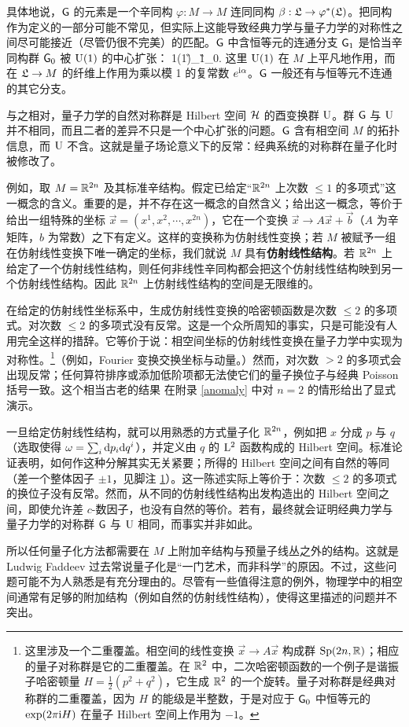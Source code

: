 具体地说，${\text{\sf G}}$ 的元素是一个辛同构 $\varphi:M\to M$ 连同同构 $\beta:{\mathfrak L}\to \varphi^*({\mathfrak L})$。把同构作为定义的一部分可能不常见，但实际上这能导致经典力学与量子力学的对称性之间尽可能接近（尽管仍很不完美）的匹配。${\text{\sf G}}$ 中含恒等元的连通分支 ${\text{\sf G}}_1$ 是恰当辛同构群 ${\text{\sf G}}_0$ 被 ${\mathrm U}(1)$ 的中心扩张：
\be\label{centext}1\to \UU(1)\to \G_1\to \G_0. \ee
这里 ${\mathrm U}(1)$ 在 $M$ 上平凡地作用，而在 ${\mathfrak L}\to M$ 的纤维上作用为乘以模 1 的复常数 $e^{{\mathrm i}\alpha}$。${\text{\sf G}}$ 一般还有与恒等元不连通的其它分支。

与之相对，量子力学的自然对称群是 Hilbert 空间 ${\mathcal H}$ 的酉变换群 ${\mathrm U}$。群 ${\text{\sf G}}$ 与 ${\mathrm U}$ 并不相同，而且二者的差异不只是一个中心扩张的问题。${\text{\sf G}}$ 含有相空间 $M$ 的拓扑信息，而 ${\mathrm U}$ 不含。这就是量子场论意义下的反常：经典系统的对称群在量子化时被修改了。

例如，取 $M={\mathbb R}^{2n}$ 及其标准辛结构。假定已给定“${\mathbb R}^{2n}$ 上次数 $\leq 1$ 的多项式”这一概念的含义。重要的是，并不存在这一概念的自然含义；给出这一概念，等价于给出一组特殊的坐标 $\vec x =(x^1,x^2,\cdots, x^{2n})$，它在一个变换 $\vec x \to A\vec x +\vec b$（$A$ 为辛矩阵，$b$ 为常数）之下有定义。这样的变换称为仿射线性变换；若 $M$ 被赋予一组在仿射线性变换下唯一确定的坐标，我们就说 $M$ 具有\textbf{仿射线性结构}。若 ${\mathbb R}^{2n}$ 上给定了一个仿射线性结构，则任何非线性辛同构都会把这个仿射线性结构映到另一个仿射线性结构。因此 ${\mathbb R}^{2n}$ 上仿射线性结构的空间是无限维的。

在给定的仿射线性坐标系中，生成仿射线性变换的哈密顿函数是次数 $\leq 2$ 的多项式。对次数 $\leq 2$ 的多项式没有反常。这是一个众所周知的事实，只是可能没有人用完全这样的措辞。它等价于说：相空间坐标的仿射线性变换在量子力学中实现为对称性。\footnote{\label{cext}这里涉及一个二重覆盖。相空间的线性变换 $\vec x\to A\vec x$ 构成群 ${\mathrm{Sp}}(2n,{\mathbb R})$；相应的量子对称群是它的二重覆盖。在 ${\mathbb R}^2$ 中，二次哈密顿函数的一个例子是谐振子哈密顿量 $H=\frac{1}{2}(p^2+q^2)$，它生成 ${\mathbb R}^2$ 的一个旋转。量子对称群是经典对称群的二重覆盖，因为 $H$ 的能级是半整数，于是对应于 ${\text{\sf G}}_0$ 中恒等元的 $\exp(2\pi{\mathrm i} H)$ 在量子 Hilbert 空间上作用为 $-1$。}（例如，Fourier 变换交换坐标与动量。）然而，对次数 $>2$ 的多项式会出现反常；任何算符排序或添加低阶项都无法使它们的量子换位子与经典 Poisson 括号一致。这个相当古老的结果 \cite{G46,V51,Todorov} 在附录 \ref{anomaly} 中对 $n=2$ 的情形给出了显式演示。

一旦给定仿射线性结构，就可以用熟悉的方式量子化 ${\mathbb R}^{2n}$，例如把 $x$ 分成 $p$ 与 $q$（选取使得 $\omega = \sum_i {\mathrm d} p_i {\mathrm d} q^i$），并定义由 $q$ 的 ${\mathrm L}^2$ 函数构成的 Hilbert 空间。标准论证表明，如何作这种分解其实无关紧要；所得的 Hilbert 空间之间有自然的等同（差一个整体因子 $\pm 1$，见脚注 \ref{cext}）。这一陈述实际上等价于：次数 $\leq 2$ 的多项式的换位子没有反常。然而，从不同的仿射线性结构出发构造出的 Hilbert 空间之间，即使允许差 $c$-数因子，也没有自然的等价。若有，最终就会证明经典力学与量子力学的对称群 ${\text{\sf G}}$ 与 ${\mathrm U}$ 相同，而事实并非如此。

所以任何量子化方法都需要在 $M$ 上附加辛结构与预量子线丛之外的结构。这就是 Ludwig Faddeev 过去常说量子化是“一门艺术，而非科学”的原因。不过，这些问题可能不为人熟悉是有充分理由的。尽管有一些值得注意的例外，物理学中的相空间通常有足够的附加结构（例如自然的仿射线性结构），使得这里描述的问题并不突出。
